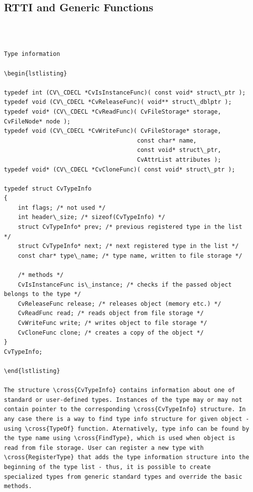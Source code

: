 \subsection{RTTI and Generic Functions}
\begin{verbatim}


\end{verbatim}
\label{CvTypeInfo}
\begin{verbatim}

Type information

\begin{lstlisting}

typedef int (CV\_CDECL *CvIsInstanceFunc)( const void* struct\_ptr );
typedef void (CV\_CDECL *CvReleaseFunc)( void** struct\_dblptr );
typedef void* (CV\_CDECL *CvReadFunc)( CvFileStorage* storage, CvFileNode* node );
typedef void (CV\_CDECL *CvWriteFunc)( CvFileStorage* storage,
                                      const char* name,
                                      const void* struct\_ptr,
                                      CvAttrList attributes );
typedef void* (CV\_CDECL *CvCloneFunc)( const void* struct\_ptr );

typedef struct CvTypeInfo
{
    int flags; /* not used */
    int header\_size; /* sizeof(CvTypeInfo) */
    struct CvTypeInfo* prev; /* previous registered type in the list */
    struct CvTypeInfo* next; /* next registered type in the list */
    const char* type\_name; /* type name, written to file storage */

    /* methods */
    CvIsInstanceFunc is\_instance; /* checks if the passed object belongs to the type */
    CvReleaseFunc release; /* releases object (memory etc.) */
    CvReadFunc read; /* reads object from file storage */
    CvWriteFunc write; /* writes object to file storage */
    CvCloneFunc clone; /* creates a copy of the object */
}
CvTypeInfo;

\end{lstlisting}

The structure \cross{CvTypeInfo} contains information about one of standard or user-defined types. Instances of the type may or may not contain pointer to the corresponding \cross{CvTypeInfo} structure. In any case there is a way to find type info structure for given object - using \cross{TypeOf} function. Aternatively, type info can be found by the type name using \cross{FindType}, which is used when object is read from file storage. User can register a new type with \cross{RegisterType} that adds the type information structure into the beginning of the type list - thus, it is possible to create specialized types from generic standard types and override the basic methods.


\end{verbatim}

